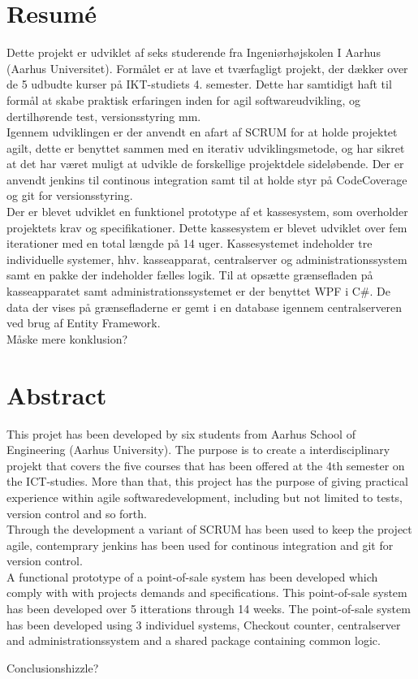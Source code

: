 \section*{Resumé}
Dette projekt er udviklet af seks studerende fra Ingeniørhøjskolen I Aarhus (Aarhus Universitet). Formålet er at lave et tværfagligt projekt, der dækker over de 5 udbudte kurser på IKT-studiets 4. semester. Dette har samtidigt haft til formål at skabe praktisk erfaringen inden for agil softwareudvikling, og dertilhørende test, versionsstyring mm.\\
Igennem udviklingen er der anvendt en afart af SCRUM for at holde projektet agilt, dette er benyttet sammen med en iterativ udviklingsmetode, og har sikret at det har været muligt at udvikle de forskellige projektdele sideløbende. Der er anvendt jenkins til continous integration samt til at holde styr på CodeCoverage og git for versionsstyring. \\
Der er blevet udviklet en funktionel prototype af et kassesystem, som overholder projektets krav og specifikationer. Dette kassesystem er blevet udviklet over fem iterationer med en total længde på 14 uger. Kassesystemet indeholder tre individuelle systemer, hhv. kasseapparat, centralserver og administrationssystem samt en pakke der indeholder fælles logik. 
Til at opsætte grænsefladen på kasseapparatet samt administrationssystemet er der benyttet WPF i C\#. De data der vises på grænsefladerne er gemt i en database igennem centralserveren ved brug af Entity Framework. \\
Måske mere konklusion?


\section*{Abstract}
This projet has been developed by six students from Aarhus School of Engineering (Aarhus University). The purpose is to create a interdisciplinary projekt that covers the five courses that has been offered at the 4th semester on the ICT-studies. More than that, this project has the purpose of giving practical experience within agile softwaredevelopment, including but not limited to tests, version control and so forth.\\
Through the development a variant of SCRUM has been used to keep the project agile, contemprary jenkins has been used for continous integration and git for version control.\\
A functional prototype of a point-of-sale system has been developed which comply with with projects demands and specifications. This point-of-sale system has been developed over 5 itterations through 14 weeks. The point-of-sale system has been developed using 3 individuel systems, Checkout counter, centralserver and administrationssystem and a shared package containing common logic.

Conclusionshizzle?